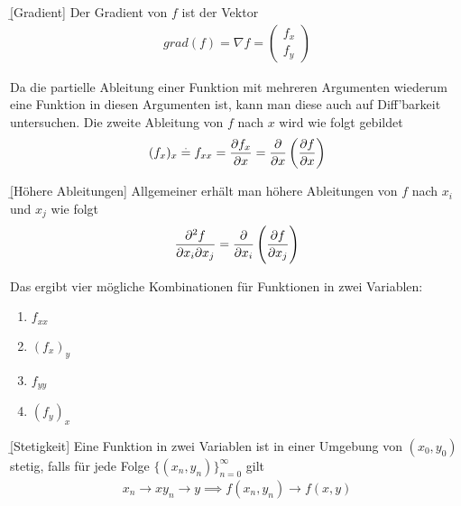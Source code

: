 \documentclass[12pt]{article}
\begin{document}
\begin{defn}{\b{[Gradient]}}
        Der Gradient  von $f$ ist der Vektor
        \begin{align}
                grad(f)=\nabla f = \begin{pmatrix}
                                           f_x \\
                                           f_y
                                   \end{pmatrix}
        \end{align}
\end{defn}

Da die partielle Ableitung einer Funktion mit mehreren Argumenten wiederum eine
Funktion in diesen Argumenten ist, kann man diese auch auf Diff'barkeit
untersuchen. Die zweite Ableitung von $f$ nach $x$ wird wie folgt gebildet
\begin{align}
        (f_{x})_x\overset{.}{=} f_{xx}=\pdv{f_x}{x}=\frac{\partial}{\partial x}\left(\pdv{f}{x}\right)
\end{align}

\begin{defn}{\b{[Höhere Ableitungen]}}
        Allgemeiner erhält man höhere Ableitungen von $f$ nach $x_i$ und $x_j$ wie folgt
        \begin{align}
                \frac{\partial^2 f}{\partial x_i\partial x_j}=\frac{\partial}{\partial x_i}\left(\pdv{f}{x_j}\right)
        \end{align}

        Das ergibt vier mögliche Kombinationen für Funktionen in zwei Variablen:
        \begin{enumerate}[topsep=0pt,itemsep=0.15em]
                \item $f_{xx}$
                \item $(f_{x})_y$
                \item $f_{yy}$
                \item $(f_y)_x$
        \end{enumerate}
\end{defn}

\begin{defn}{\b{[Stetigkeit]}}
        Eine Funktion in zwei Variablen ist in einer Umgebung von $(x_0,y_0)$ stetig, falls für jede Folge $\{(x_n,y_n)\}_{n=0}^{\infty}$ gilt
        \begin{align}
                x_n\to x y_n\to y \implies f(x_n,y_n)\to f(x,y)
        \end{align}
\end{defn}
\end{document}
